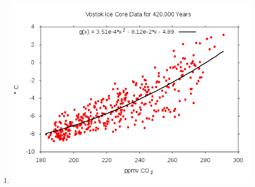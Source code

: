 \begin{enumerate}
\begin{enumerate}
      \item \includegraphics[scale=0.5]{00LOG/2017-07-12/00FIGURES/VOSTOK_ppmv_CO2_vs_deltaT_quadratic_fit.png}
    \end{enumerate}
\end{enumerate}
